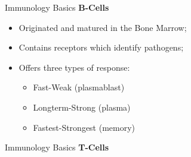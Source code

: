 \documentclass[xcolor=svgnames]{beamer}
\begin{document}
    	\begin{frame}{Immunology Basics}
            \textbf{B-Cells}
            \vspace{1em}
            \begin{itemize}
                \item Originated and matured in the Bone Marrow;
                \item Contains receptors which identify pathogens;
                \item Offers three types of response:
                    \begin{itemize}
                        \item Fast-Weak (plasmablast)
                        \item Longterm-Strong (plasma)
                        \item Fastest-Strongest (memory)
                    \end{itemize}
            \end{itemize}
        \end{frame}
        
        \begin{frame}{Immunology Basics}
          \textbf{T-Cells}
          \vspace{1em}
          \begin{itemize}
          \end{itemize}
        \end{frame}
                         
\end{document}
